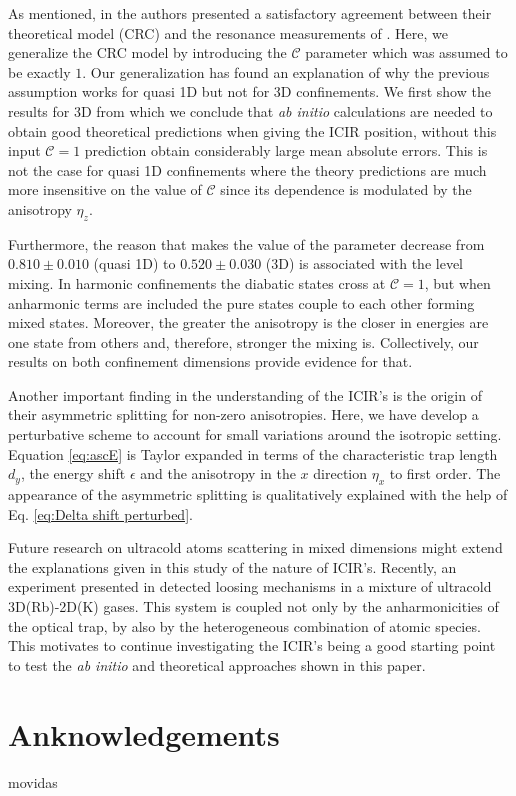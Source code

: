 \documentclass[aps,pre,twocolumn,superscriptaddress,showpacs]{revtex4-1}
\newcommand{\abinitio}{\textit{ab initio }}
\begin{document}
As mentioned, in \cite{PhysRevLett.109.073201} the authors presented a satisfactory agreement between their theoretical model (CRC) and the resonance measurements of \cite{PhysRevLett.104.153203}. Here, we generalize the CRC model by introducing the $\mathcal{C}$ parameter which was assumed to be exactly $1$. Our generalization has found an explanation of why the previous assumption works for quasi 1D  but not for 3D confinements. We first show the results for 3D from which we conclude that \abinitio calculations are needed to obtain good theoretical predictions when giving the ICIR position, without this input $\mathcal{C}=1$ prediction obtain considerably large mean absolute errors. This is not the case for quasi 1D confinements where the theory predictions are much more insensitive on the value of $\mathcal{C}$ since its dependence is modulated by the anisotropy $\eta_z$. 

Furthermore, the reason that makes the value of the parameter decrease from $0.810 \pm 0.010$ (quasi 1D) to $0.520 \pm 0.030$ (3D) is associated with the level mixing. In harmonic confinements the diabatic states cross at $\mathcal{C}=1$, but when anharmonic terms are included the pure states couple to each other forming mixed states. Moreover, the greater the anisotropy is the closer in energies are one state from others and, therefore, stronger the mixing is. Collectively, our results on both confinement dimensions provide evidence for that.

Another important finding in the understanding of the ICIR's is the origin of their asymmetric splitting for non-zero anisotropies. Here, we have develop a perturbative scheme to account for small variations around the isotropic setting. Equation \eqref{eq:ascE} is Taylor expanded in terms of the characteristic trap length $d_y$, the energy shift $\epsilon$ and the anisotropy in the $x$ direction $\eta_x$ to first order. The appearance of the asymmetric splitting is qualitatively explained with the help of Eq. \eqref{eq:Delta shift perturbed}.

Future research on ultracold atoms scattering in mixed dimensions might extend the explanations given in this study of the nature of ICIR's. Recently, an experiment presented in \cite{PhysRevLett.104.153202} detected loosing mechanisms in a mixture of ultracold 3D(Rb)-2D(K) gases. This system is coupled not only by the anharmonicities of the optical trap, by also by the heterogeneous combination of atomic species. This motivates to continue investigating the ICIR's being a good starting point to test the \abinitio and theoretical approaches shown in this paper.
\section{Anknowledgements}
movidas



\end{document}
